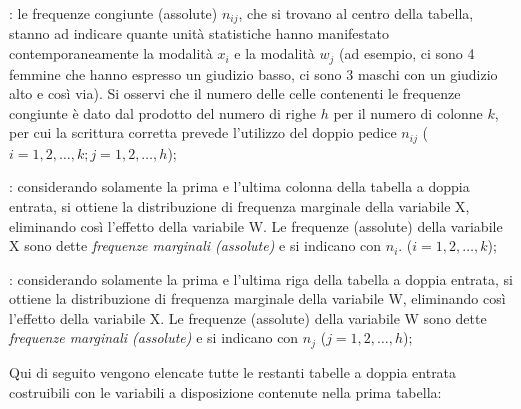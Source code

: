 \begin{description} [noitemsep]
        \item [distribuzione congiunta di X e di W]: 
le frequenze congiunte (assolute) \(n_{ij}\), 
che si trovano al centro della tabella, 
stanno ad indicare quante unità statistiche hanno manifestato 
contemporaneamente la modalità \(x_i\) e la modalità \(w_j\) (ad esempio, ci 
sono 4 femmine che hanno espresso un giudizio basso, ci sono 3 maschi con 
un giudizio alto e così via). Si osservi che il numero delle celle 
contenenti le frequenze congiunte è dato dal prodotto del numero di righe 
\(h\) per il numero di colonne \(k\), per cui la scrittura corretta prevede 
l'utilizzo del doppio pedice \(n_{ij}\) (\(i=1,2,\dots,k; j=1,2,\dots,h\));
        \item [distribuzione marginale di X]: 
considerando solamente 
la prima e l'ultima colonna della tabella a doppia entrata, si ottiene la 
distribuzione di frequenza marginale della variabile X, eliminando così 
l'effetto della variabile W. Le frequenze (assolute) della variabile X sono 
dette \emph{frequenze marginali (assolute)} e si indicano con \(n_i\). 
(\(i=1,2,\dots,k\));
        \item [distribuzione marginale di W]: 
considerando solamente 
la prima e l'ultima riga della tabella a doppia entrata, si ottiene la 
distribuzione di frequenza marginale della variabile W, eliminando così 
l'effetto della variabile X. Le frequenze (assolute) della variabile W sono 
dette \emph{frequenze marginali (assolute)} e si indicano con \(n_j\) 
(\(j=1,2,\dots,h\));
\end{description}

Qui di seguito vengono elencate tutte le restanti tabelle a doppia entrata 
costruibili con le variabili a disposizione contenute nella prima tabella:


